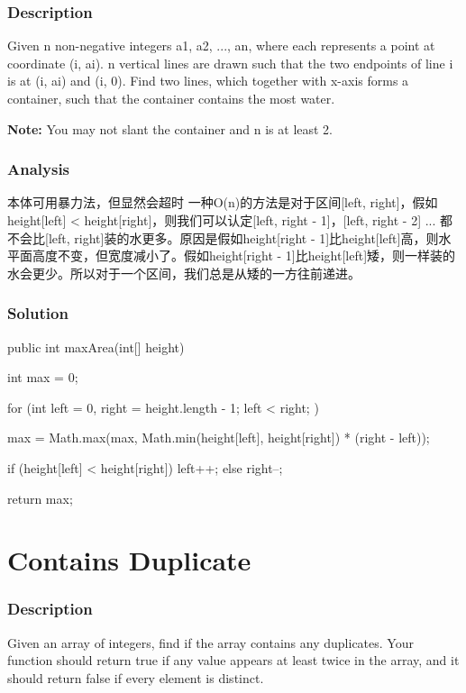 \subsubsection{Description}
Given n non-negative integers a1, a2, ..., an, where each represents a point at coordinate (i, ai). n vertical lines are drawn such that the two endpoints of line i is at (i, ai) and (i, 0). Find two lines, which together with x-axis forms a container, such that the container contains the most water.

\textbf{Note:} You may not slant the container and n is at least 2.

\subsubsection{Analysis}
本体可用暴力法，但显然会超时
一种O(n)的方法是对于区间[left, right]，假如height[left] < height[right]，则我们可以认定[left, right - 1]，[left, right - 2] ...
都不会比[left, right]装的水更多。原因是假如height[right - 1]比height[left]高，则水平面高度不变，但宽度减小了。假如height[right - 1]比height[left]矮，则一样装的水会更少。所以对于一个区间，我们总是从矮的一方往前递进。

\subsubsection{Solution}

\begin{Code}
public int maxArea(int[] height) {
    int max = 0;

    for (int left = 0, right = height.length - 1; left < right; ) {
        max = Math.max(max, Math.min(height[left], height[right]) * (right - left));

        if (height[left] < height[right]) {
            left++;
        } else {
            right--;
        }
    }

    return max;
}
\end{Code}

\newpage

\section{Contains Duplicate} %

\subsubsection{Description}
Given an array of integers, find if the array contains any duplicates. Your function should return true if any value appears at least twice in the array, and it should return false if every element is distinct.

